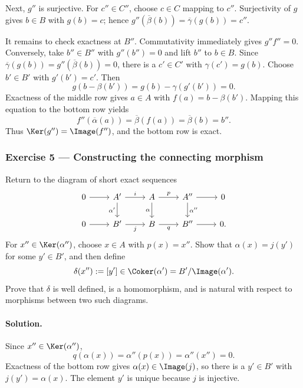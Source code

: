 Next, $g''$ is surjective. For $c''\in C''$, choose $c\in C$ mapping to
$c''$. Surjectivity of $g$ gives $b\in B$ with $g(b)=c$; hence
$g''(\overline\beta(b))=\overline\gamma(g(b))=c''$.

It remains to check exactness at $B''$. Commutativity immediately gives
$g''f''=0$. Conversely, take $b''\in B''$ with $g''(b'')=0$ and lift
$b''$ to $b\in B$. Since
$\overline\gamma(g(b))=g''(\overline\beta(b))=0$, there is a $c'\in C'$
with $\gamma(c')=g(b)$. Choose $b'\in B'$ with $g'(b')=c'$. Then
\[
	g(b-\beta(b'))=g(b)-\gamma(g'(b'))=0.
\]
Exactness of the middle row gives $a\in A$ with
$f(a)=b-\beta(b')$. Mapping this equation to the bottom row yields
\[
	f''(\overline\alpha(a))
	=\overline\beta(f(a))
	=\overline\beta(b)=b''.
\]
Thus $\Ker(g'')=\Image(f'')$, and the bottom row is exact.

\subsubsection*{Exercise 5 --- Constructing the connecting morphism}
\hypertarget{o014.mastery.diagram-chasing.001.ex05}{ }
\label{mastery:diagram-chasing-001-ex05}

Return to the diagram of short exact sequences
\[
\begin{tikzcd}
	0 \arrow[r] & A' \arrow[r, "i"] \arrow[d, "\alpha'"'] & A \arrow[r, "p"] \arrow[d, "\alpha"'] & A'' \arrow[r] \arrow[d, "\alpha''"] & 0 \\
	0 \arrow[r] & B' \arrow[r, "j"'] & B \arrow[r, "q"'] & B'' \arrow[r] & 0.
\end{tikzcd}
\]
For $x''\in\Ker(\alpha'')$, choose $x\in A$ with $p(x)=x''$. Show that
$\alpha(x)=j(y')$ for some $y'\in B'$, and then define
\[
	\delta(x''):=[y']\in\Coker(\alpha')=B'/\Image(\alpha').
\]
Prove that $\delta$ is well defined, is a homomorphism, and is natural with
respect to morphisms between two such diagrams.

\paragraph{Solution.}
\hypertarget{o014.mastery.diagram-chasing.001.sol05}{ }
Since $x''\in\Ker(\alpha'')$,
\[
	q(\alpha(x))=\alpha''(p(x))=\alpha''(x'')=0.
\]
Exactness of the bottom row gives $\alpha(x)\in\Image(j)$, so there is a
$y'\in B'$ with $j(y')=\alpha(x)$. The element $y'$ is unique because $j$
is injective.

